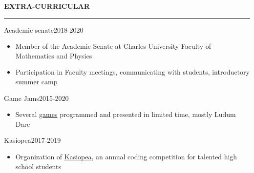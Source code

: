 \documentclass[11pt,a4paper]{article} %
\newcommand{\hSection}[1]{
    \medskip
    \MakeUppercase{\bf #1}
    \medskip
    \hrule
}
\newcommand{\hSubsectionItemize}[3]{
    {#1}\hfill {\footnotesize #2}\hspace{-1cm}\\
    \vspace{-0.5cm}
    \begin{itemize} \footnotesize #3 \end{itemize}
    \vspace{0.3\baselineskip}
}
\begin{document}
\hSection{Extra-Curricular}
\hSubsectionItemize
{Academic senate}
{2018-2020}
{
\item Member of the Academic Senate at Charles University Faculty of Mathematics and Physics
\item Participation in Faculty meetings, communicating with students, introductory summer camp 
}

\hSubsectionItemize
{Game Jams}
{2015-2020}
{
\item Several \href{https://github.com/allemansratten}{games} programmed and presented in limited time, mostly Ludum Dare
}

\hSubsectionItemize
{Kasiopea}
{2017-2019}
{
\item Organization of \href{https://kasiopea.matfyz.cz/}{Kasiopea}, an annual coding competition for talented high school students
}
\end{document}
